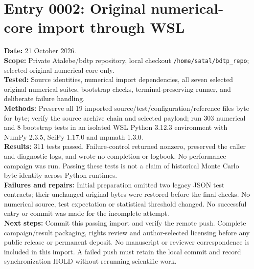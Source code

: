 \section*{Entry 0002: Original numerical-core import through WSL}
\textbf{Date:} 21 October 2026.\\
\textbf{Scope:} Private Atalebe/bdtp repository, local checkout
\texttt{/home/satal/bdtp\_repo}; selected original numerical core only.\\
\textbf{Tested:} Source identities, numerical import dependencies, all seven
selected original numerical suites, bootstrap checks, terminal-preserving runner,
and deliberate failure handling.\\
\textbf{Methods:} Preserve all 19 imported source/test/configuration/reference files
byte for byte; verify the source archive chain and selected payload; run 303 numerical
and 8 bootstrap tests in an isolated WSL Python 3.12.3 environment with NumPy 2.3.5,
SciPy 1.17.0 and mpmath 1.3.0.\\
\textbf{Results:} 311 tests passed. Failure-control returned nonzero, preserved the
caller and diagnostic logs, and wrote no completion or logbook. No performance
campaign was run. Passing these tests is not a claim of historical Monte Carlo
byte identity across Python runtimes.\\
\textbf{Failures and repairs:} Initial preparation omitted two legacy JSON test
contracts; their unchanged original bytes were restored before the final checks.
No numerical source, test expectation or statistical threshold changed. No successful
entry or commit was made for the incomplete attempt.\\
\textbf{Next steps:} Commit this passing import and verify the remote push. Complete
campaign/result packaging, rights review and author-selected licensing before any
public release or permanent deposit. No manuscript or reviewer correspondence is
included in this import. A failed push must retain the local commit and record
synchronization HOLD without rerunning scientific work.
